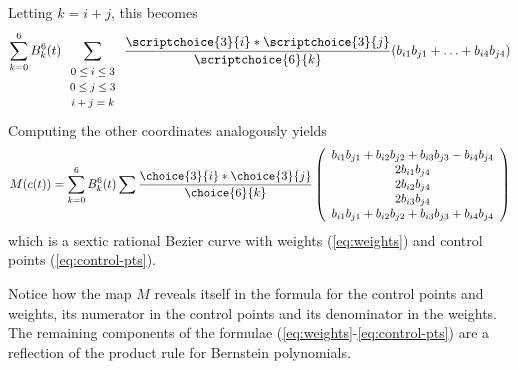 Letting $k=i+j$, this becomes
\[ \sum_{k=0}^6 B_k^6(t) 
	\sum_{\begin{array}{c}  \mbox{\footnotesize{$0 \leq i \leq 3$}} \\ 
			     \mbox{\footnotesize{$0 \leq j \leq 3$}} \\ 
			     \mbox{\footnotesize{$i+j=k$}}
			     \end{array}} 
	\frac{\scriptchoice{3}{i} * \scriptchoice{3}{j}}{\scriptchoice{6}{k}}
	(b_{i1} b_{j1} + \ldots + b_{i4} b_{j4}) \]
Computing the other coordinates analogously yields
\[ M(c(t)) = 
   \sum_{k=0}^6 B_k^6(t)
	\sum \frac{\choice{3}{i} * \choice{3}{j}}{\choice{6}{k}}
	\left( \begin{array}{c}
            b_{i1} b_{j1} + b_{i2} b_{j2} + b_{i3} b_{j3} - b_{i4} b_{j4} \\
            2b_{i1} b_{j4} \\
            2b_{i2} b_{j4} \\
            2b_{i3} b_{j4} \\
            b_{i1} b_{j1} + b_{i2} b_{j2} + b_{i3} b_{j3} + b_{i4} b_{j4}
	\end{array} \right) \]
%
which is a sextic rational Bezier curve with weights (\ref{eq:weights}) and 
control points (\ref{eq:control-pts}).
\QED

Notice how the map $M$ reveals itself in the formula for the control points
and weights, its numerator in the control points and its denominator
in the weights.
The remaining components of the formulae (\ref{eq:weights}-\ref{eq:control-pts})
are a reflection of the product rule for Bernstein polynomials.

